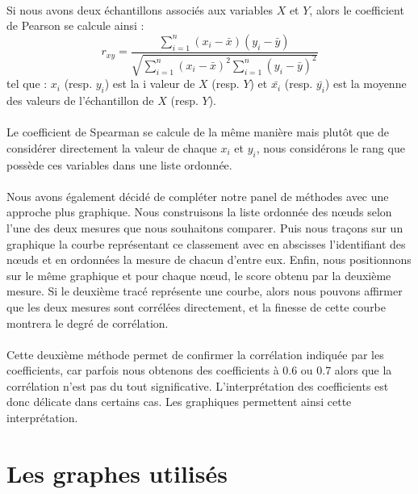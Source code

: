 \documentclass[a4paper, 10pt]{report}
\begin{document}
\paragraph{}Si nous avons deux échantillons associés aux variables $X$ et $Y$, alors le coefficient de Pearson se calcule ainsi : 
$$
r_{xy}=
\frac{\sum\limits_{i=1}^n (x_i-\bar{x})(y_i-\bar{y})}{\sqrt{\sum\limits_{i=1}^n (x_i-\bar{x})^2 \sum\limits_{i=1}^n (y_i-\bar{y})^2}}
$$
tel que : $x_i$ (resp. $y_i$) est la i valeur de $X$ (resp. $Y$) et $\bar{x_i}$ (resp. $\bar{y_i}$) est la moyenne des valeurs de l'échantillon de $X$ (resp. $Y$).
 
\paragraph{}Le coefficient de Spearman se calcule de la même manière mais plutôt que de considérer directement la valeur de chaque $x_i$ et $y_i$, nous considérons le rang que possède ces variables dans une liste ordonnée.

\paragraph{}Nous avons également décidé de compléter notre panel de méthodes avec une approche plus graphique. Nous construisons la liste ordonnée des n\oe uds selon l'une des deux mesures que nous souhaitons comparer. Puis nous traçons sur un graphique la courbe représentant ce classement avec en abscisses l'identifiant des n\oe uds et en ordonnées la mesure de chacun d'entre eux. Enfin, nous positionnons sur le même graphique et pour chaque n\oe ud, le score obtenu par la deuxième mesure. Si le deuxième tracé représente une courbe, alors nous pouvons affirmer que les deux mesures sont corrélées directement, et la finesse de cette courbe montrera le degré de corrélation.

\paragraph{}Cette deuxième méthode permet de confirmer la corrélation indiquée par les coefficients, car parfois nous obtenons des coefficients à 0.6 ou 0.7 alors que la corrélation n'est pas du tout significative. L'interprétation des coefficients est donc délicate dans certains cas. Les graphiques permettent ainsi cette interprétation.

	\section{Les graphes utilisés}
	
\end{document}
